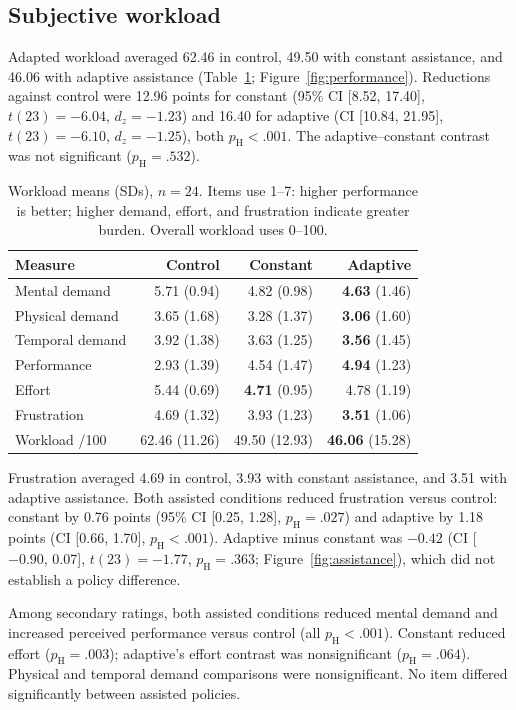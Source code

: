 \documentclass[sigconf,anonymous]{aamas}
\begin{document}
\subsection{Subjective workload}
Adapted workload averaged 62.46 in control, 49.50 with constant assistance, and 46.06 with adaptive assistance (Table~\ref{tab:workload}; Figure~\ref{fig:performance}). Reductions against control were 12.96 points for constant (95\% CI [8.52, 17.40], $t(23)=-6.04$, $d_z=-1.23$) and 16.40 for adaptive (CI [10.84, 21.95], $t(23)=-6.10$, $d_z=-1.25$), both $p_{\mathrm{H}}<.001$. The adaptive--constant contrast was not significant ($p_{\mathrm{H}}=.532$).

\begin{table}[H]
\centering
\caption{Workload means (SDs), $n=24$. Items use 1--7: higher performance is better; higher demand, effort, and frustration indicate greater burden. Overall workload uses 0--100.}
\label{tab:workload}
\setlength{\tabcolsep}{3pt}
\begin{tabular}{lrrr}
\toprule
Measure & Control & Constant & Adaptive \\
\midrule
Mental demand & 5.71 (0.94) & 4.82 (0.98) & \textbf{4.63} (1.46) \\
Physical demand & 3.65 (1.68) & 3.28 (1.37) & \textbf{3.06} (1.60) \\
Temporal demand & 3.92 (1.38) & 3.63 (1.25) & \textbf{3.56} (1.45) \\
Performance & 2.93 (1.39) & 4.54 (1.47) & \textbf{4.94} (1.23) \\
Effort & 5.44 (0.69) & \textbf{4.71} (0.95) & 4.78 (1.19) \\
Frustration & 4.69 (1.32) & 3.93 (1.23) & \textbf{3.51} (1.06) \\
Workload /100 & 62.46 (11.26) & 49.50 (12.93) & \textbf{46.06} (15.28) \\
\bottomrule
\end{tabular}
\end{table}

Frustration averaged 4.69 in control, 3.93 with constant assistance, and 3.51 with adaptive assistance. Both assisted conditions reduced frustration versus control: constant by 0.76 points (95\% CI [0.25, 1.28], $p_{\mathrm{H}}=.027$) and adaptive by 1.18 points (CI [0.66, 1.70], $p_{\mathrm{H}}<.001$). Adaptive minus constant was $-0.42$ (CI [$-0.90$, 0.07], $t(23)=-1.77$, $p_{\mathrm{H}}=.363$; Figure~\ref{fig:assistance}), which did not establish a policy difference.

Among secondary ratings, both assisted conditions reduced mental demand and increased perceived performance versus control (all $p_{\mathrm{H}}<.001$). Constant reduced effort ($p_{\mathrm{H}}=.003$); adaptive's effort contrast was nonsignificant ($p_{\mathrm{H}}=.064$). Physical and temporal demand comparisons were nonsignificant. No item differed significantly between assisted policies.
\end{document}
